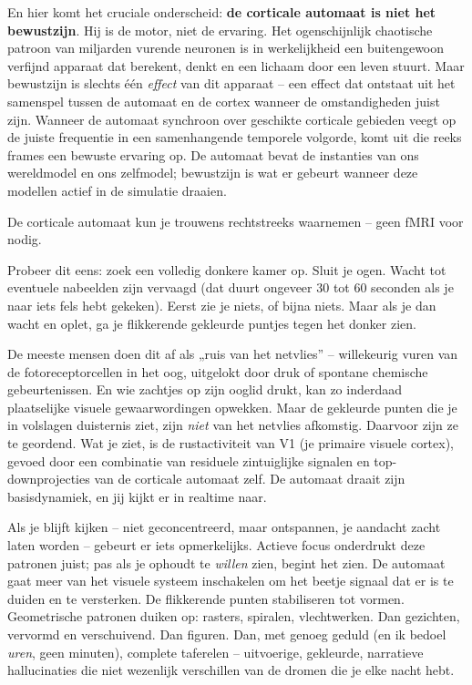 \documentclass[11pt, twoside, openright]{book}
\begin{document}
En hier komt het cruciale onderscheid: \textbf{de corticale automaat is niet het bewustzijn}. Hij is de motor, niet de ervaring. Het ogenschijnlijk chaotische patroon van miljarden vurende neuronen is in werkelijkheid een buitengewoon verfijnd apparaat dat berekent, denkt en een lichaam door een leven stuurt. Maar bewustzijn is slechts één \textit{effect} van dit apparaat -- een effect dat ontstaat uit het samenspel tussen de automaat en de cortex wanneer de omstandigheden juist zijn. Wanneer de automaat synchroon over geschikte corticale gebieden veegt op de juiste frequentie in een samenhangende temporele volgorde, komt uit die reeks frames een bewuste ervaring op. De automaat bevat de instanties van ons wereldmodel en ons zelfmodel; bewustzijn is wat er gebeurt wanneer deze modellen actief in de simulatie draaien.

De corticale automaat kun je trouwens rechtstreeks waarnemen -- geen fMRI voor nodig.

Probeer dit eens: zoek een volledig donkere kamer op. Sluit je ogen. Wacht tot eventuele nabeelden zijn vervaagd (dat duurt ongeveer 30 tot 60 seconden als je naar iets fels hebt gekeken). Eerst zie je niets, of bijna niets. Maar als je dan wacht en oplet, ga je flikkerende gekleurde puntjes tegen het donker zien.

De meeste mensen doen dit af als „ruis van het netvlies” -- willekeurig vuren van de fotoreceptorcellen in het oog, uitgelokt door druk of spontane chemische gebeurtenissen. En wie zachtjes op zijn ooglid drukt, kan zo inderdaad plaatselijke visuele gewaarwordingen opwekken. Maar de gekleurde punten die je in volslagen duisternis ziet, zijn \textit{niet} van het netvlies afkomstig. Daarvoor zijn ze te geordend. Wat je ziet, is de rustactiviteit van V1 (je primaire visuele cortex), gevoed door een combinatie van residuele zintuiglijke signalen en top-downprojecties van de corticale automaat zelf. De automaat draait zijn basisdynamiek, en jij kijkt er in realtime naar.

Als je blijft kijken -- niet geconcentreerd, maar ontspannen, je aandacht zacht laten worden -- gebeurt er iets opmerkelijks. Actieve focus onderdrukt deze patronen juist; pas als je ophoudt te \textit{willen} zien, begint het zien. De automaat gaat meer van het visuele systeem inschakelen om het beetje signaal dat er is te duiden en te versterken. De flikkerende punten stabiliseren tot vormen. Geometrische patronen duiken op: rasters, spiralen, vlechtwerken. Dan gezichten, vervormd en verschuivend. Dan figuren. Dan, met genoeg geduld (en ik bedoel \textit{uren}, geen minuten), complete taferelen -- uitvoerige, gekleurde, narratieve hallucinaties die niet wezenlijk verschillen van de dromen die je elke nacht hebt.
\end{document}
